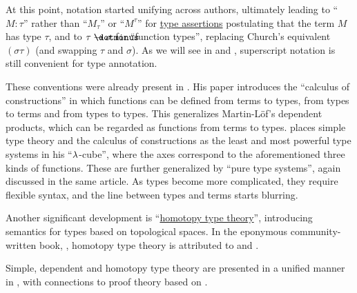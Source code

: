 \begin{remark}
  At this point, notation started unifying across authors, ultimately leading to \enquote{\( M: \tau \)} rather than \enquote{\( M_\tau \)} or \enquote{\( M^\tau \)} for \hyperref[def:type_assertion]{type assertions} postulating that the term \( M \) has type \( \tau \), and to \( \tau \synimplies \sigma \) for \enquote{function types}, replacing Church's equivalent \( (\sigma\tau) \) (and swapping \( \tau \) and \( \sigma \)). As we will see in  and , superscript notation is still convenient for type annotation.

  These conventions were already present in . His paper introduces the \enquote{calculus of constructions} in which functions can be defined from terms to types, from types to terms and from types to types. This generalizes Martin-L\"of's dependent products, which can be regarded as functions from terms to types.  places simple type theory and the calculus of constructions as the least and most powerful type systems in his \enquote{\( \mathrm{\lambda} \)-cube}, where the axes correspond to the aforementioned three kinds of functions. These are further generalized by \enquote{pure type systems}, again discussed in the same article. As types become more complicated, they require flexible syntax, and the line between types and terms starts blurring.

  Another significant development is \enquote{\hyperref[con:homotopy_type_theory]{homotopy type theory}}, introducing semantics for types based on topological spaces. In the eponymous community-written book, \cite{UnivalentProject2024OctoberHoTT}, homotopy type theory is attributed to \cite{Voevodski2006HoTT} and \cite{AwodeyWarren2009HoTT}.

  Simple, dependent and homotopy type theory are presented in a unified manner in \cite{Mimram2020ProgramEqualsProof}, with connections to proof theory based on .
\end{remark}

